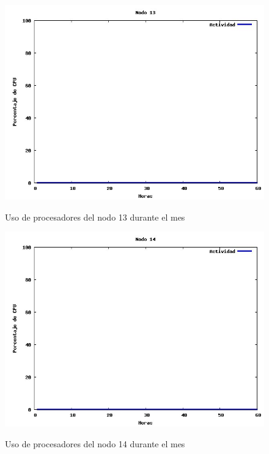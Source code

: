 \documentclass[11pt,a4paper,oneside,openany]{report}
\begin{document}
\begin{figure}[htb]
\centering
\includegraphics[width=0.9\linewidth]{grafico13.jpg}\\
\caption{Uso de procesadores del nodo 13 durante el mes}
\end{figure}

\begin{figure}[htb]
\centering
\includegraphics[width=0.9\linewidth]{grafico14.jpg}\\
\caption{Uso de procesadores del nodo 14 durante el mes}
\end{figure}
\end{document}
